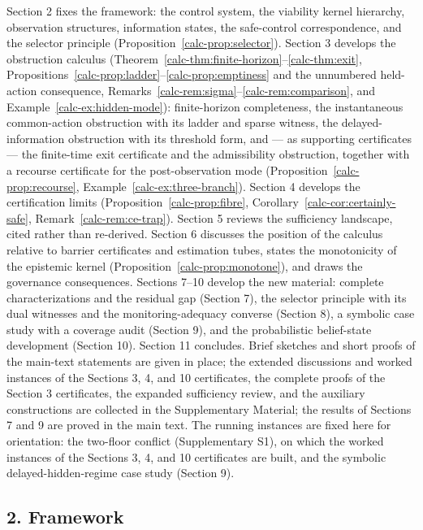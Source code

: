 \documentclass[10pt,twocolumn]{article}
\theoremstyle{definition}
\begin{document}
Section 2 fixes the framework: the control system, the viability kernel
hierarchy, observation structures, information states, the safe-control
correspondence, and the selector principle (Proposition~\ref{calc-prop:selector}). Section 3 develops the obstruction calculus (Theorem~\ref{calc-thm:finite-horizon}--\ref{calc-thm:exit}, Propositions~\ref{calc-prop:ladder}--\ref{calc-prop:emptiness} and the unnumbered held-action consequence, Remarks~\ref{calc-rem:sigma}--\ref{calc-rem:comparison}, and Example~\ref{calc-ex:hidden-mode}): finite-horizon completeness, the instantaneous common-action obstruction with its ladder and sparse witness, the delayed-information obstruction with its threshold form, and --- as supporting certificates --- the finite-time exit certificate and the admissibility obstruction, together with a recourse certificate for the post-observation mode (Proposition~\ref{calc-prop:recourse}, Example~\ref{calc-ex:three-branch}). Section 4 develops the certification limits
(Proposition~\ref{calc-prop:fibre}, Corollary~\ref{calc-cor:certainly-safe}, Remark~\ref{calc-rem:ce-trap}). Section 5 reviews the sufficiency landscape, cited rather than re-derived. Section
6 discusses the position of the calculus relative to barrier
certificates and estimation tubes, states the monotonicity of the
epistemic kernel (Proposition~\ref{calc-prop:monotone}), and draws the governance
consequences. Sections 7--10 develop the new material: complete characterizations and the residual gap (Section 7), the selector principle with its dual witnesses and the monitoring-adequacy converse (Section 8), a symbolic case study with a coverage audit (Section 9), and the probabilistic belief-state development (Section 10). Section 11 concludes. Brief sketches and short proofs of the main-text statements are given in place; the extended discussions and worked instances of the Sections 3, 4, and 10 certificates, the complete proofs of the Section 3 certificates, the expanded sufficiency review, and the auxiliary constructions are collected in the Supplementary Material; the results of Sections 7 and 9 are proved in the main text. The running
instances are fixed here for orientation: the two-floor conflict
(Supplementary S1), on which the worked instances of the Sections 3, 4,
and 10 certificates are built, and the symbolic delayed-hidden-regime
case study (Section 9).



\subsection{2. Framework}\label{calc-framework}
\end{document}
